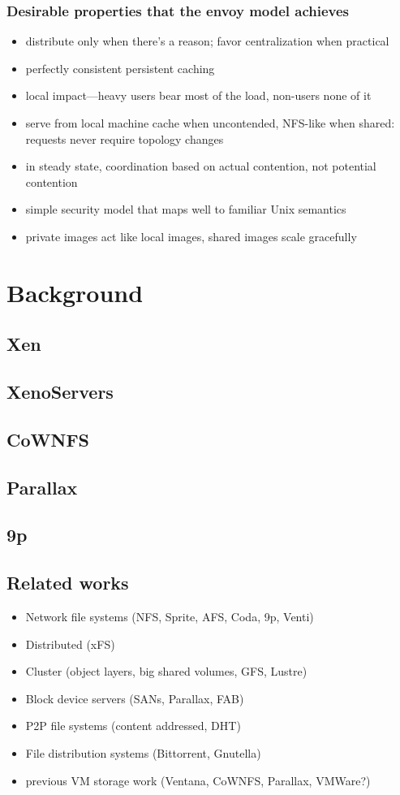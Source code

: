 \documentclass[a4paper,12pt]{article}
\begin{document}
\subsubsection{Desirable properties that the envoy model achieves}
\begin{itemize}
\item distribute only when there's a reason; favor centralization when practical
\item perfectly consistent persistent caching
\item local impact---heavy users bear most of the load, non-users none of it
\item serve from local machine cache when uncontended, NFS-like when shared: requests never require topology changes
\item in steady state, coordination based on actual contention, not potential contention
\item simple security model that maps well to familiar Unix semantics
\item private images act like local images, shared images scale gracefully
\end{itemize}


\section{Background}

\subsection{Xen}
\subsection{XenoServers}
\subsection{CoWNFS}
\subsection{Parallax}
\subsection{9p}
\subsection{Related works}
\begin{itemize}
\item Network file systems (NFS, Sprite, AFS, Coda, 9p, Venti)
\item Distributed (xFS)
\item Cluster (object layers, big shared volumes, GFS, Lustre)
\item Block device servers (SANs, Parallax, FAB)
\item P2P file systems (content addressed, DHT)
\item File distribution systems (Bittorrent, Gnutella)
\item previous VM storage work (Ventana, CoWNFS, Parallax, VMWare?)
\end{itemize}
\end{document}
